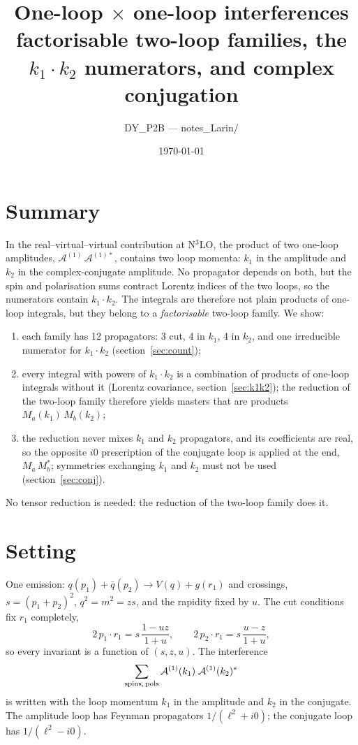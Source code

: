 \documentclass[11pt,a4paper]{article}
\title{One-loop $\times$ one-loop interferences\\[2pt]\large factorisable two-loop families, the $k_1\cdot k_2$ numerators,
and complex conjugation}
\author{DY\_P2B --- notes\_Larin/}
\date{\today}
\begin{document}
\maketitle

\section*{Summary}

In the real--virtual--virtual contribution at N$^3$LO, the product of two one-loop amplitudes,
$\mathcal{A}^{(1)}\,\mathcal{A}^{(1)*}$, contains two loop momenta: $k_1$ in the amplitude and $k_2$ in the
complex-conjugate amplitude. No propagator depends on both, but the spin and polarisation sums contract Lorentz
indices of the two loops, so the numerators contain $k_1\cdot k_2$. The integrals are therefore not plain products
of one-loop integrals, but they belong to a \emph{factorisable} two-loop family. We show:
\begin{enumerate}
\item each family has 12 propagators: 3 cut, 4 in $k_1$, 4 in $k_2$, and one irreducible numerator for
$k_1\cdot k_2$ (section~\ref{sec:count});
\item every integral with powers of $k_1\cdot k_2$ is a combination of products of one-loop integrals without it
(Lorentz covariance, section~\ref{sec:k1k2}); the reduction of the two-loop family therefore yields masters that are
products $M_a(k_1)\,M_b(k_2)$;
\item the reduction never mixes $k_1$ and $k_2$ propagators, and its coefficients are real, so the opposite $i0$
prescription of the conjugate loop is applied at the end, $M_a\,M_b^*$; symmetries exchanging $k_1$ and $k_2$ must
not be used (section~\ref{sec:conj}).
\end{enumerate}
No tensor reduction is needed: the reduction of the two-loop family does it.

\section{Setting}

One emission: $q(p_1)+\bar q(p_2)\to V(q)+g(r_1)$ and crossings, $s=(p_1+p_2)^2$, $q^2=m^2=zs$, and the rapidity
fixed by $u$. The cut conditions fix $r_1$ completely,
\begin{equation}
2\,p_1\cdot r_1=s\,\frac{1-uz}{1+u},\qquad 2\,p_2\cdot r_1=s\,\frac{u-z}{1+u},
\end{equation}
so every invariant is a function of $(s,z,u)$. The interference
\begin{equation}
\sum_{\rm spins,\,pols}\mathcal{A}^{(1)}(k_1)\;\mathcal{A}^{(1)}(k_2)^*
\end{equation}
is written with the loop momentum $k_1$ in the amplitude and $k_2$ in the conjugate. The amplitude loop has Feynman
propagators $1/(\ell^2+i0)$; the conjugate loop has $1/(\ell^2-i0)$.
\end{document}
